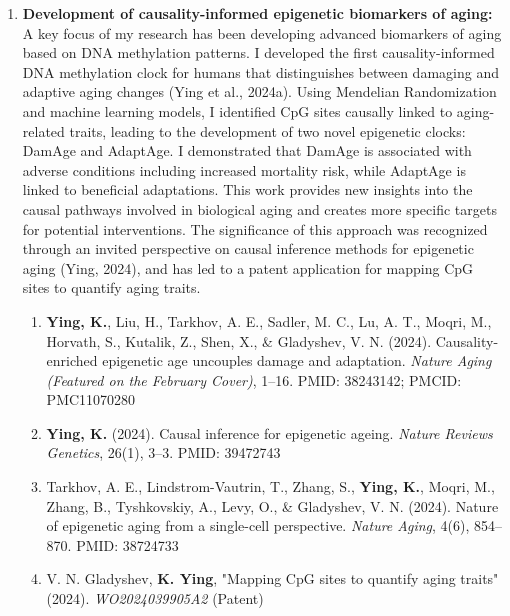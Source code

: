 \documentclass{nihbiosketch}
\begin{document}
\begin{enumerate}

\item \textbf{Development of causality-informed epigenetic biomarkers of aging:} 
A key focus of my research has been developing advanced biomarkers of aging based on DNA methylation patterns. I developed the first causality-informed DNA methylation clock for humans that distinguishes between damaging and adaptive aging changes (Ying et al., 2024a). Using Mendelian Randomization and machine learning models, I identified CpG sites causally linked to aging-related traits, leading to the development of two novel epigenetic clocks: DamAge and AdaptAge. I demonstrated that DamAge is associated with adverse conditions including increased mortality risk, while AdaptAge is linked to beneficial adaptations. This work provides new insights into the causal pathways involved in biological aging and creates more specific targets for potential interventions. The significance of this approach was recognized through an invited perspective on causal inference methods for epigenetic aging (Ying, 2024), and has led to a patent application for mapping CpG sites to quantify aging traits.

\begin{enumerate}

\item \textbf{Ying, K.}, Liu, H., Tarkhov, A. E., Sadler, M. C., Lu, A. T., Moqri, M., Horvath, S., Kutalik, Z., Shen, X., \& Gladyshev, V. N. (2024). Causality-enriched epigenetic age uncouples damage and adaptation. \textit{Nature Aging (Featured on the February Cover)}, 1--16. PMID: 38243142; PMCID: PMC11070280

\item \textbf{Ying, K.} (2024). Causal inference for epigenetic ageing. \textit{Nature Reviews Genetics}, 26(1), 3--3. PMID: 39472743

\item Tarkhov, A. E., Lindstrom-Vautrin, T., Zhang, S., \textbf{Ying, K.}, Moqri, M., Zhang, B., Tyshkovskiy, A., Levy, O., \& Gladyshev, V. N. (2024). Nature of epigenetic aging from a single-cell perspective. \textit{Nature Aging}, 4(6), 854--870. PMID: 38724733

\item V. N. Gladyshev, \textbf{K. Ying}, "Mapping CpG sites to quantify aging traits" (2024). \textit{WO2024039905A2} (Patent)

\end{enumerate}



\end{enumerate}
\end{document}
